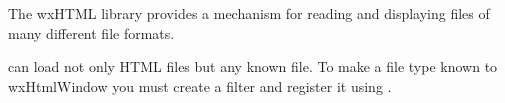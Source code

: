 \label{filters}

The wxHTML library provides a mechanism for reading and displaying
files of many different file formats. 

 can load not
only HTML files but any known file. To make a file type known to wxHtmlWindow
you must create a  filter and
register it using .

